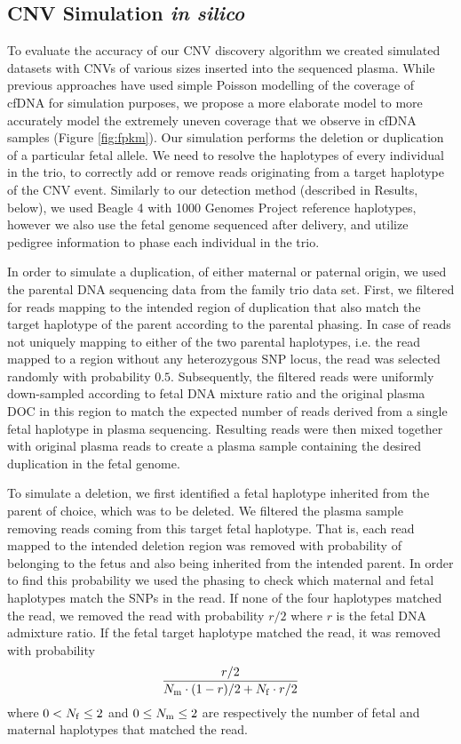 \subsection{CNV Simulation \emph{in silico}}\label{ss:simulation}
To evaluate the accuracy of our CNV discovery algorithm we created simulated datasets with CNVs of various sizes inserted into the sequenced plasma. While previous approaches have used simple Poisson modelling of the coverage of cfDNA \citep{chen2013} for simulation purposes, we propose a more elaborate model to more accurately model the extremely uneven coverage that we observe in cfDNA samples (Figure \ref{fig:fpkm}). Our simulation performs the deletion or duplication of a particular fetal allele.  We need to resolve the haplotypes of every individual in the trio, to correctly add or remove reads originating from a target haplotype of the CNV event. Similarly to our detection method (described in Results, below), we used Beagle 4 \citep{browning2013} with 1000 Genomes Project reference haplotypes, however we also use the fetal genome sequenced after delivery, and utilize pedigree information to phase each individual in the trio.

	In order to simulate a duplication, of either maternal or paternal origin, we used the parental DNA sequencing data from the family trio data set. First, we filtered for reads mapping to the intended region of duplication that also match the target haplotype of the parent according to the parental phasing. In case of reads not uniquely mapping to either of the two parental haplotypes, i.e. the read mapped to a region without any heterozygous SNP locus, the read was selected randomly with probability $0.5$. Subsequently, the filtered reads were uniformly down-sampled according to fetal DNA mixture ratio and the original plasma DOC in this region to match the expected number of reads derived from a single fetal haplotype in plasma sequencing. Resulting reads were then mixed together with original plasma reads to create a plasma sample containing the desired duplication in the fetal genome.
	
	To simulate a deletion, we first identified a fetal haplotype inherited from the parent of choice, which was to be deleted. We filtered the plasma sample removing reads coming from this target fetal haplotype. That is, each read mapped to the intended deletion region was removed with probability of belonging to the fetus and also being inherited from the intended parent. In order to find this probability we used the phasing to check which maternal and fetal haplotypes match the SNPs in the read. If none of the four haplotypes matched the read, we removed the read with probability $r/2$ where $r$ is the fetal DNA admixture ratio. If the fetal target haplotype matched the read, it was removed with probability
\begin{align}
\frac{ r/2 } { N_{\mathrm{m}} \cdot (1-r)/2 + N_{\mathrm{f}} \cdot r/2}
\end{align}
where $0 < N_{\mathrm{f}} \leq 2$ and $0 \leq N_{\mathrm{m}} \leq 2$ are respectively the number of fetal and maternal haplotypes that matched the read.
	
